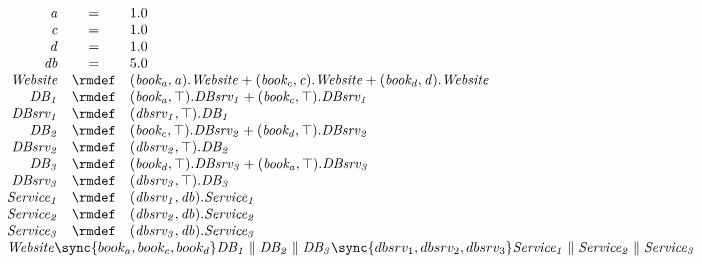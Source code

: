 \begin{displaymath}
	\begin{array}{rcl}
		\mathit{a} & = & 1.0\\
		\mathit{c} & = & 1.0\\
		\mathit{d} & = & 1.0\\
		\mathit{db} & = & 5.0\\
[0.0ex]		\mathit{Website} & \rmdef & (\mathit{book_a},\mathit{a}).\mathit{Website}+(\mathit{book_c},\mathit{c}).\mathit{Website}+(\mathit{book_d},\mathit{d}).\mathit{Website}\\
		\mathit{DB_1} & \rmdef & (\mathit{book_a},\top).\mathit{DBsrv_1}+(\mathit{book_c},\top).\mathit{DBsrv_1}\\
		\mathit{DBsrv_1} & \rmdef & (\mathit{dbsrv_1},\top).\mathit{DB_1}\\
		\mathit{DB_2} & \rmdef & (\mathit{book_c},\top).\mathit{DBsrv_2}+(\mathit{book_d},\top).\mathit{DBsrv_2}\\
		\mathit{DBsrv_2} & \rmdef & (\mathit{dbsrv_2},\top).\mathit{DB_2}\\
		\mathit{DB_3} & \rmdef & (\mathit{book_d},\top).\mathit{DBsrv_3}+(\mathit{book_a},\top).\mathit{DBsrv_3}\\
		\mathit{DBsrv_3} & \rmdef & (\mathit{dbsrv_3},\top).\mathit{DB_3}\\
		\mathit{Service_1} & \rmdef & (\mathit{dbsrv_1},\mathit{db}).\mathit{Service_1}\\
		\mathit{Service_2} & \rmdef & (\mathit{dbsrv_2},\mathit{db}).\mathit{Service_2}\\
		\mathit{Service_3} & \rmdef & (\mathit{dbsrv_3},\mathit{db}).\mathit{Service_3}\\
[0.0ex]		\multicolumn{3}{l}{\mathit{Website}\sync{book_a,book_c,book_d}\mathit{DB_1}\parallel\mathit{DB_2}\parallel\mathit{DB_3}\sync{dbsrv_1,dbsrv_2,dbsrv_3}\mathit{Service_1}\parallel\mathit{Service_2}\parallel\mathit{Service_3}}\\
[0.0ex]	\end{array}
\end{displaymath}
